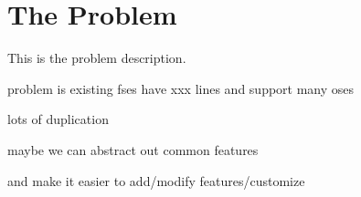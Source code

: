 \section{The Problem}
\label{sec:problem}

This is the problem description.

problem is existing fses have xxx lines and support many oses

lots of duplication

maybe we can abstract out common features

and make it easier to add/modify features/customize


